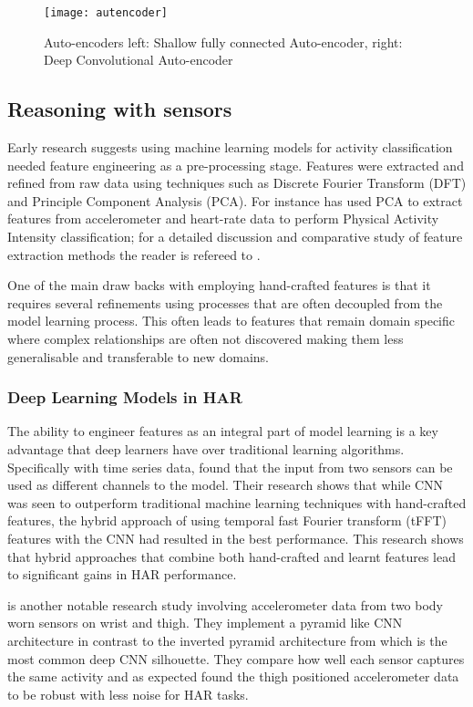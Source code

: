\begin{figure}[ht]
\centering
\texttt{[image: autencoder]}
\caption{Auto-encoders left: Shallow fully connected Auto-encoder, right: Deep Convolutional Auto-encoder }
\label{fig:ae}
\end{figure}

\subsection{Reasoning with sensors}

Early research suggests using machine learning models for activity classification needed feature engineering as a pre-processing stage. Features were extracted and refined from raw data using techniques such as Discrete Fourier Transform (DFT) and Principle Component Analysis (PCA). For instance  has used PCA to extract features from accelerometer and heart-rate data to perform Physical Activity Intensity classification; for a detailed discussion and comparative study of feature extraction methods the reader is refereed to . 

One of the main draw backs with employing hand-crafted features is that it requires several refinements using processes that are often decoupled from the model learning process. This often leads to features that remain domain specific where complex relationships are often not discovered making them less generalisable and transferable to new domains.

\subsubsection{Deep Learning Models in HAR}
The ability to engineer features as an integral part of model learning is a key advantage that deep learners have over traditional learning algorithms.
Specifically with time series data, 
 found that the input from two sensors can be used as different channels to the model. Their research shows that while CNN was seen to outperform traditional machine learning techniques with hand-crafted features, the hybrid approach of using temporal fast Fourier transform (tFFT) features with the CNN had resulted in the best performance. This research shows that hybrid approaches that combine both hand-crafted and learnt features lead to significant gains in HAR performance.

 is another notable research study involving accelerometer data from two body worn sensors on wrist and thigh. They implement a pyramid like CNN architecture in contrast to the inverted pyramid architecture from  which is the most common deep CNN silhouette. They compare how well each sensor captures the same activity and as expected found the thigh positioned accelerometer data to be robust with less noise for HAR tasks.

